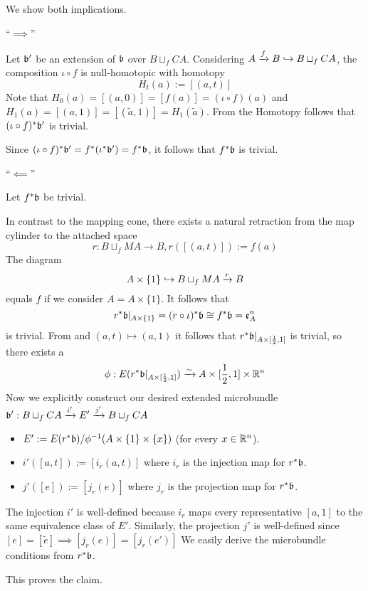 \begin{myproof}
    We show both implications.

    ``$\implies$''

    Let $\bb'$ be an extension of $\bb$ over $B \sqcup_f CA$.
    Considering $A \xto{f} B \incl B \sqcup_f CA$, the composition $\iota \circ f$ is null-homotopic with homotopy
    \[ H_t(a) := [(a, t)] \]
    Note that $H_0(a) = [(a, 0)] = [f(a)] = (\iota \circ f)(a)$ and $H_1(a) = [(a, 1)] = [(\tilde{a}, 1)] = H_1(\tilde{a})$.
    From the Homotopy  follows that $(\iota \circ f)^*\bb'$ is trivial. 

    Since $(\iota \circ f)^*\bb' = f^*(\iota^*\bb') = f^*\bb$, it follows that $f^*\bb$ is trivial.

    ``$\impliedby$''

    Let $f^*\bb$ be trivial.

    In contrast to the mapping cone, there exists a natural retraction from the map cylinder to the attached space
    \[ r: B \sqcup_f MA \to B, r([(a, t)]) := f(a) \]
    The diagram
    \[ A \times \{1\} \incl B \sqcup_f MA \xto{r} B \]
    equals $f$ if we consider $A = A \times \{1\}$.
    It follows that
    \[ r^*\bb\restr{A \times \{1\}} = (r \circ \iota)^*\bb \cong f^*\bb = \mathfrak{e}^n_A\]
    is trivial.
    From  and $(a, t) \mapsto (a, 1)$ it follows that $r^*\bb\restr{A \times [\frac{1}{2}, 1]}$ is trivial,
    so there exists a
    \[ \phi: E(r^*\bb\restr{A \times [\frac{1}{2}, 1]}) \isomto A \times [\frac{1}{2}, 1] \times \R^n \]
    Now we explicitly construct our desired extended microbundle $\bundledef{\bb'}{B \sqcup_f CA}{E'}{i'}{j'}$
    \begin{itemize}
        \item $E' := E(r^*\bb) / \phi^{-1}(A \times \{1\} \times \{x\})$ (for every $x \in \R^n$).
        \item $i'([a, t]) := [i_r(a, t)]$ where $i_r$ is the injection map for $r^*\bb$.
        \item $j'([e]) := [j_r(e)]$ where $j_r$ is the projection map for $r^*\bb$.
    \end{itemize}
    The injection $i'$ is well-defined because $i_r$ maps every representative $[a, 1]$ to the same equivalence class of $E'$.
    Similarly, the projection $j'$ is well-defined since $[e] = [\tilde{e}] \implies [j_r(e)] = [j_r(e')]$
    We easily derive the microbundle conditions from $r^*\bb$.

    This proves the claim.
\end{myproof}